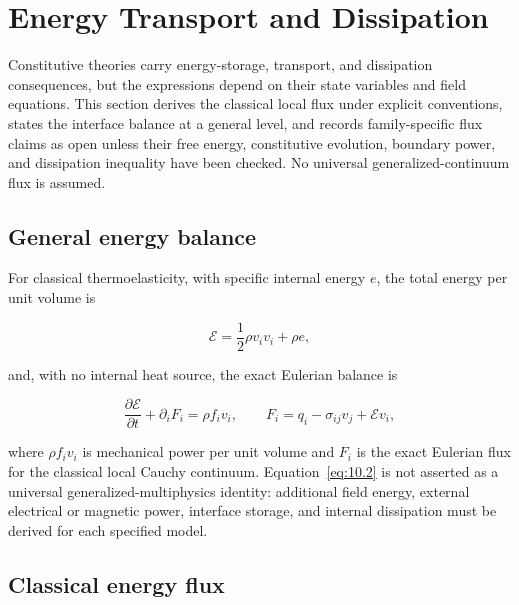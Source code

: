 \section{Energy Transport and Dissipation}
\label{sec:energy}

Constitutive theories carry energy-storage, transport, and dissipation consequences, but the expressions depend on their state variables and field equations. This section derives the classical local flux under explicit conventions, states the interface balance at a general level, and records family-specific flux claims as open unless their free energy, constitutive evolution, boundary power, and dissipation inequality have been checked. No universal generalized-continuum flux is assumed.

\subsection{General energy balance}
\label{sec:10.1}

For classical thermoelasticity, with specific internal energy $e$, the total energy per unit volume is

\begin{equation}
\mathcal{E} = \frac{1}{2}\rho v_i v_i + \rho e,
\label{eq:10.1}
\end{equation}

and, with no internal heat source, the exact Eulerian balance is

\begin{equation}
\frac{\partial\mathcal{E}}{\partial t} + \partial_i F_i = \rho f_i v_i,
\qquad F_i=q_i-\sigma_{ij}v_j+\mathcal{E}v_i,
\label{eq:10.2}
\end{equation}

where $\rho f_i v_i$ is mechanical power per unit volume and $F_i$ is the exact Eulerian flux for the classical local Cauchy continuum. Equation~\eqref{eq:10.2} is not asserted as a universal generalized-multiphysics identity: additional field energy, external electrical or magnetic power, interface storage, and internal dissipation must be derived for each specified model.

\subsection{Classical energy flux}
\label{sec:10.2}


